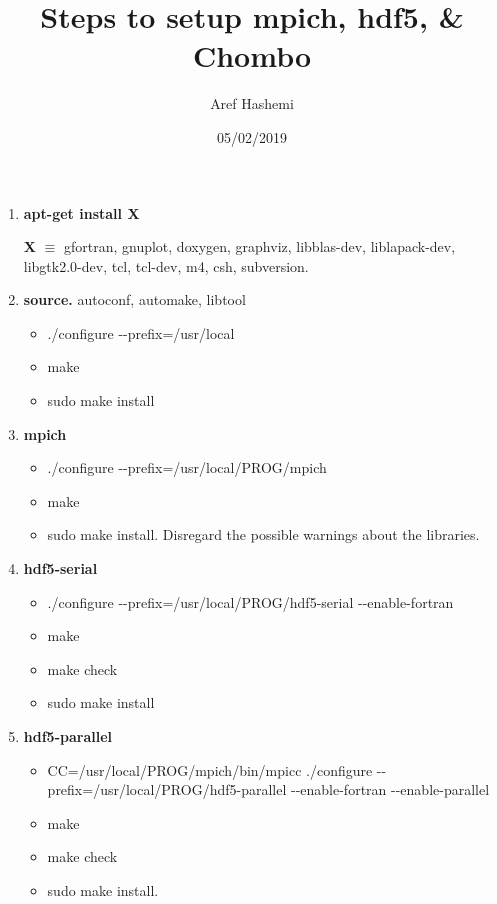 \documentclass{article}
\title{Steps to setup mpich, hdf5, \& Chombo}
\author{Aref Hashemi}
\date{05/02/2019}
\begin{document}
\maketitle

\begin{enumerate}[label=\textbf{\arabic*})]
\item \textbf{apt-get install X}

  \textbf{X} $\equiv$ gfortran, gnuplot, doxygen, graphviz, libblas-dev, liblapack-dev, libgtk2.0-dev, tcl, tcl-dev, m4, csh, subversion.
  
\item \textbf{source.} autoconf, automake, libtool

  \begin{itemize}
  \item .\slash configure -{}-prefix=\slash usr\slash local
  \item make
  \item sudo make install
  \end{itemize}

\item \textbf{mpich}
  
  \begin{itemize}
  \item .\slash configure -{}-prefix=\slash usr\slash local\slash PROG\slash mpich
  \item make
  \item sudo make install. Disregard the possible warnings about the libraries.
  \end{itemize}
  
\item \textbf{hdf5-serial}

  \begin{itemize} 
  \item .\slash configure -{}-prefix=\slash usr\slash local\slash PROG\slash hdf5-serial -{}-enable-fortran
  \item make
  \item make check
  \item sudo make install
  \end{itemize}


\item \textbf{hdf5-parallel}

  \begin{itemize}
  \item CC=\slash usr\slash local\slash PROG\slash mpich\slash bin\slash mpicc .\slash configure -{}-prefix=\slash usr\slash local\slash PROG\slash hdf5-parallel -{}-enable-fortran -{}-enable-parallel
  \item make
  \item make check
  \item sudo make install.
  \end{itemize}


\end{enumerate}
\end{document}
